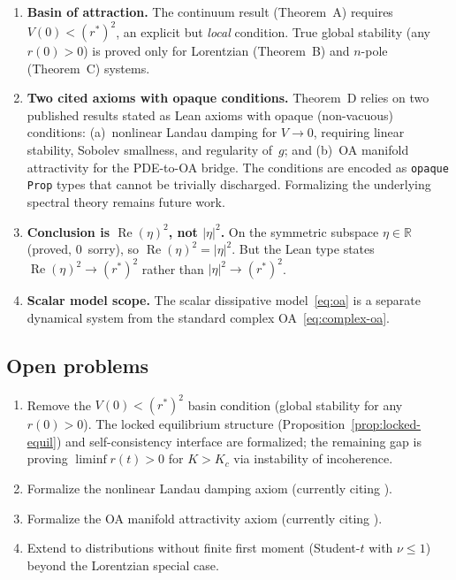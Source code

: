 \documentclass[11pt,a4paper]{article}
\theoremstyle{definition}
\DeclareMathOperator{\re}{Re}
\newcommand{\R}{\mathbb{R}}
\begin{document}
\begin{enumerate}
\item \textbf{Basin of attraction.} The continuum result (Theorem~A) requires $V(0) < (r^*)^2$, an explicit but \emph{local} condition. True global stability (any $r(0) > 0$) is proved only for Lorentzian (Theorem~B) and $n$-pole (Theorem~C) systems.

\item \textbf{Two cited axioms with opaque conditions.} Theorem~D relies on two published results stated as Lean axioms with opaque (non-vacuous) conditions: (a)~nonlinear Landau damping \cite{dietert2017} for $V \to 0$, requiring linear stability, Sobolev smallness, and regularity of~$g$; and (b)~OA manifold attractivity \cite{dietert-fernandez2018} for the PDE-to-OA bridge. The conditions are encoded as \texttt{opaque Prop} types that cannot be trivially discharged. Formalizing the underlying spectral theory remains future work.

\item \textbf{Conclusion is $\re(\eta)^2$, not $|\eta|^2$.} On the symmetric subspace $\eta \in \R$ (proved, 0~sorry), so $\re(\eta)^2 = |\eta|^2$. But the Lean type states $\re(\eta)^2 \to (r^*)^2$ rather than $|\eta|^2 \to (r^*)^2$.

\item \textbf{Scalar model scope.} The scalar dissipative model~\eqref{eq:oa} is a separate dynamical system from the standard complex OA~\eqref{eq:complex-oa}.
\end{enumerate}

\subsection{Open problems}

\begin{enumerate}
\item Remove the $V(0) < (r^*)^2$ basin condition (global stability for any $r(0) > 0$). The locked equilibrium structure (Proposition~\ref{prop:locked-equil}) and self-consistency interface are formalized; the remaining gap is proving $\liminf r(t) > 0$ for $K > K_c$ via instability of incoherence.
\item Formalize the nonlinear Landau damping axiom (currently citing \cite{dietert2017}).
\item Formalize the OA manifold attractivity axiom (currently citing \cite{dietert-fernandez2018}).
\item Extend to distributions without finite first moment (Student-$t$ with $\nu \leq 1$) beyond the Lorentzian special case.
\end{enumerate}
\end{document}
